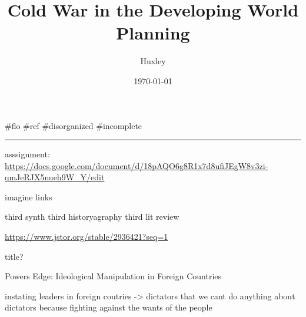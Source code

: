 \documentclass[letterpaper]{article}
\author{Huxley}
\date{\today}
\title{Cold War in the Developing World Planning}
\renewcommand{\tableofcontents}{}
\begin{document}
\tableofcontents

\#flo \#ref \#disorganized \#incomplete

\noindent\rule{\textwidth}{0.5pt}

asssignment:
\url{https://docs.google.com/document/d/18pAQO6g8R1x7d8ufiJEgW8v3zi-qmJeRJX5nueh9W\_Y/edit}

imagine links

third synth third historyagraphy third lit review

\url{https://www.jstor.org/stable/2936421?seq=1}

title?

Powers Edge: Ideological Manipulation in Foreign Countries

instating leaders in foreign coutries -> dictators that we cant do
anything about dictators because fighting against the wants of the
people
\end{document}
